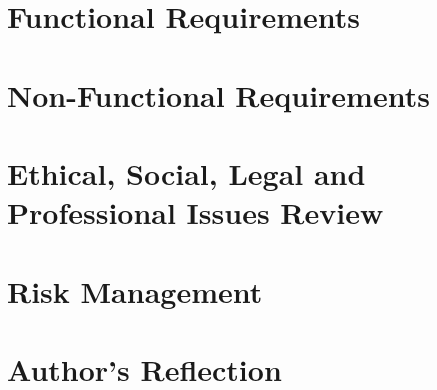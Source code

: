 \section{Functional Requirements}
\label{evaluation_functional_requirements}


\section{Non-Functional Requirements}
\label{evaluation_non_functional_requirements}


\section{Ethical, Social, Legal and Professional Issues Review}
\label{ethical_social_legal_and_professional_issues_review}


\section{Risk Management}
\label{evaluation_risk_management}


\section{Author's Reflection}
\label{authors_reflection}

